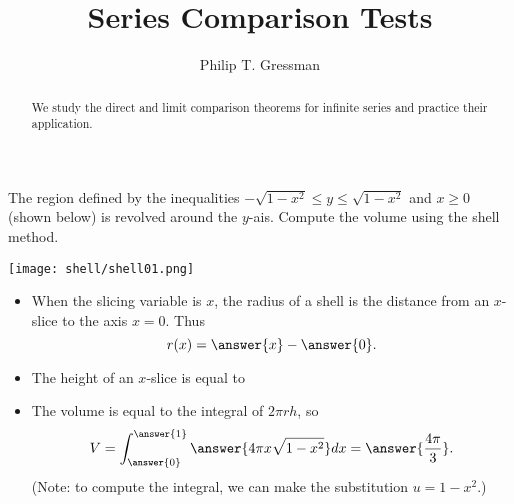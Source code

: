\documentclass{ximera}
\title{Series Comparison Tests}
\author{Philip T. Gressman}
\begin{document}
\begin{abstract}
We study the direct and limit comparison theorems for infinite series and practice their application.
\end{abstract}
\maketitle

\begin{example}
The region defined by the inequalities $-\sqrt{1-x^2} \leq y \leq \sqrt{1-x^2}$ and $x \geq 0$ (shown below) is revolved around the $y$-ais. Compute the volume using the shell method.
\begin{center}
\begin{image}
\texttt{[image: shell/shell01.png]}
\end{image}
\end{center}
\begin{itemize}
\item When the slicing variable is $x$, the radius of a shell is the  distance from an $x$-slice to the axis $x = 0$. Thus
\[ r(x) = \answer{x} - \answer{0}. \]
\item The height of an $x$-slice is equal to
\begin{multipleChoice}
\end{multipleChoice}
\item The volume is equal to the integral of $2 \pi r h$, so 
\[ V = \int_{\answer{0}}^{\answer{1}} \answer{4 \pi x \sqrt{1-x^2}} dx = \answer{\frac{4\pi}{3}}. \]
(Note: to compute the integral, we can make the substitution $u = 1-x^2$.)
\end{itemize}
\end{example}
\end{document}
